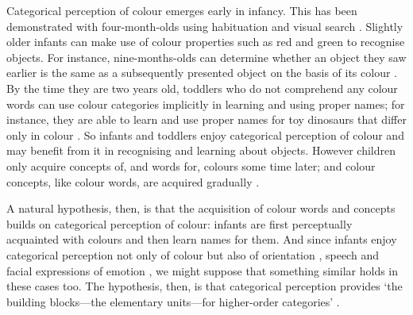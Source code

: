\documentclass[12pt,\papersize]{extarticle}
\begin{document}

Categorical perception of colour emerges early in infancy.  This has been demonstrated with four-month-olds using habituation \citep{Bornstein:1976of} and visual search \citep{Franklin:2005xk}.   
Slightly older infants can make use of colour properties such as red and green to recognise objects.  
For instance, nine-months-olds can determine whether an object they saw earlier is the same as a subsequently presented object on the basis of its colour \citep{Wilcox:2008jk}.  
By the time they are two years old, toddlers who do not comprehend any colour words can use colour categories implicitly in learning and using proper names; for instance, they are able to learn and use proper names for toy dinosaurs that differ only in colour \citep[][Experiment 3]{Soja:1994np}.  
So infants and toddlers enjoy categorical perception of colour and may benefit from it in recognising and learning about objects.  
However children only acquire concepts of, and words for, colours some time later; and colour concepts, like colour words, are acquired gradually \citep{Pitchford:2005hm,Kowalski:2006hk,Sandhofer:1999if,Sandhofer:2006qo}. 

A natural hypothesis, then, is that the acquisition of colour words and concepts builds on categorical perception of colour: infants are first perceptually acquainted with colours and then learn names for them.
And since infants enjoy categorical perception not only of colour but also of orientation \citep{franklin:2010_hemispheric}, speech \citep{Kuhl:1987la,Kuhl:2004nv,Jusczyk:1995it} and facial expressions of emotion \citep{Etcoff:1992zd,Kotsoni:2001ph,Campanella:2002aa}, 
we might suppose that something similar holds in these cases too.
The hypothesis, then, is that categorical perception provides ‘the building blocks—the elementary units—for higher-order categories’ \citep[p.\ 3]{Harnad:1987ej}.
\end{document}
